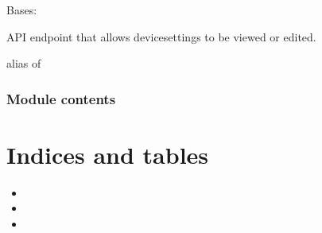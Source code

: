 \documentclass[letterpaper,10pt,english]{sphinxmanual}
\begin{document}
\begin{fulllineitems}
\label{modules/farmer:farmer.views.DeviceSettingsViewSet}
Bases: 

API endpoint that allows devicesettings to be viewed or edited.

\begin{fulllineitems}
\label{modules/farmer:farmer.views.DeviceSettingsViewSet.list}
\end{fulllineitems}


\begin{fulllineitems}
\label{modules/farmer:farmer.views.DeviceSettingsViewSet.queryset}
\end{fulllineitems}


\begin{fulllineitems}
\label{modules/farmer:farmer.views.DeviceSettingsViewSet.retrieve}
\end{fulllineitems}


\begin{fulllineitems}
\label{modules/farmer:farmer.views.DeviceSettingsViewSet.serializer_class}
alias of 

\end{fulllineitems}


\end{fulllineitems}



\subsection{Module contents}
\label{modules/farmer:module-contents}\label{modules/farmer:module-farmer}

\chapter{Indices and tables}
\label{index:indices-and-tables}\begin{itemize}
\item {} 

\item {} 

\item {} 

\end{itemize}
\end{document}
